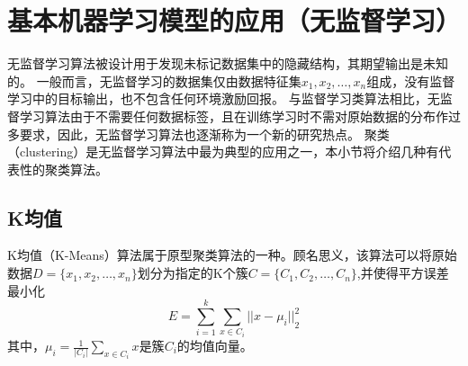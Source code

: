 \section{基本机器学习模型的应用（无监督学习）}
无监督学习算法被设计用于发现未标记数据集中的隐藏结构，其期望输出是未知的。
一般而言，无监督学习的数据集仅由数据特征集$x_1,x_2,\dots,x_n$组成，没有监督学习中的目标输出，也不包含任何环境激励回报\cite{awad2015}。
与监督学习类算法相比，无监督学习算法由于不需要任何数据标签，且在训练学习时不需对原始数据的分布作过多要求，因此，无监督学习算法也逐渐称为一个新的研究热点。
聚类（clustering）是无监督学习算法中最为典型的应用之一，本小节将介绍几种有代表性的聚类算法。

\subsection{K均值}
K均值（K-Means）算法属于原型聚类算法的一种\cite{Zhou2016,Liu2018}。顾名思义，该算法可以将原始数据$D=\{x_1,x_2,\dots,x_n\}$划分为指定的K个簇$C=\{C_1,C_2,\dots,C_n\}$,并使得平方误差最小化
\begin{equation}
    \label{equ:leastsq}
    E=\sum_{i=1}^k \sum_{x \in C_i}{||x- \mu_i||}_2^2
\end{equation}
其中，$\mu_i = \frac{1}{|C_i|} \sum_{x \in C_i}{x}$是簇$C_i$的均值向量。

